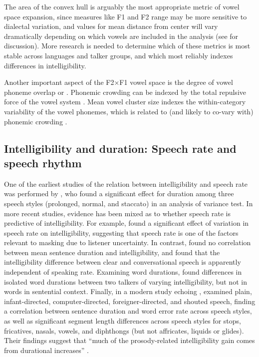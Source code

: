 The area of the convex hull is arguably the most appropriate metric of vowel space expansion, since measures like F1 and F2 range may be more sensitive to dialectal variation, and values for mean distance from center will vary dramatically depending on which vowels are included in the analysis (see \citealt{McCloyEtAl2013} for discussion).  More research is needed to determine which of these metrics is most stable across languages and talker groups, and which most reliably indexes differences in intelligibility.

Another important aspect of the F2×F1 vowel space is the degree of vowel phoneme overlap or .  Phonemic crowding can be indexed by the total repulsive force of the vowel system \citep[see][]{McCloyEtAl2013}.  Mean vowel cluster size indexes the within-category variability of the vowel phonemes, which is related to (and likely to co-vary with) phonemic crowding \citep{McCloyEtAl2013}.  


\subsection[Intelligibility and duration]{Intelligibility and duration: Speech rate and speech rhythm\label{sec:IntelDur}}
One of the earliest studies of the relation between intelligibility and speech rate was performed by \citet{Tolhurst1957a}, who found a significant effect for duration among three speech styles (prolonged, normal, and staccato) in an analysis of variance test.  In more recent studies, evidence has been mixed as to whether speech rate is predictive of intelligibility.  For example, \citet{SommersEtAl1994} found a significant effect of variation in speech rate on intelligibility, suggesting that speech rate is one of the factors relevant to masking due to listener uncertainty.  In contrast, \citet{BradlowEtAl1996} found no correlation between mean sentence duration and intelligibility, and \citet{KrauseBraida2002} found that the intelligibility difference between clear and conversational speech is apparently independent of speaking rate.  Examining word durations, \citet{BondMoore1994} found differences in isolated word durations between two talkers of varying intelligibility, but not in words in sentential context.  Finally, in a modern study echoing \citet{Tolhurst1957a}, \citet{MayoEtAl2012} examined plain, infant-directed, computer-directed, foreigner-directed, and shouted speech, finding a correlation between sentence duration and word error rate across speech styles, as well as significant segment length differences across speech styles for stops, fricatives, nasals, vowels, and diphthongs (but not affricates, liquids or glides).  Their findings suggest that “much of the prosody-related intelligibility gain comes from durational increases” \citep{MayoEtAl2012}.

